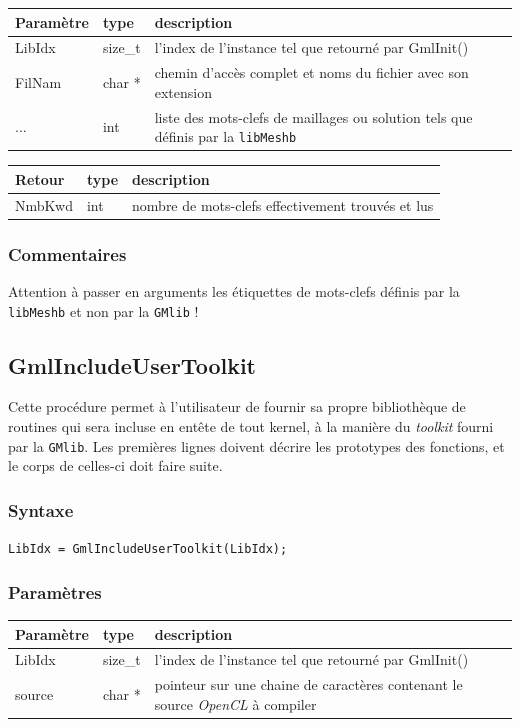 \documentclass[a4paper,12pt]{article}
\begin{document}
\begin{tabular}{|m{2cm}|m{1.5cm}|m{10.5cm}|}
\hline
Paramètre  & type    & description \\
\hline
LibIdx     & size\_t & l'index de l'instance tel que retourné par GmlInit() \\
\hline
FilNam     & char *  & chemin d'accès complet et noms du fichier avec son extension \\
\hline
...        & int     & liste des mots-clefs de maillages ou solution tels que définis par la {\tt libMeshb} \\
\hline
\end{tabular}

\medskip

\begin{tabular}{|m{2cm}|m{1.5cm}|m{10.5cm}|}
\hline
Retour     & type   & description \\
\hline
NmbKwd     & int    & nombre de mots-clefs effectivement trouvés et lus \\
\hline
\end{tabular}

\subsubsection*{Commentaires}
Attention à passer en arguments les étiquettes de mots-clefs définis par la {\tt libMeshb} et non par la {\tt GMlib} !


\subsection{GmlIncludeUserToolkit}

Cette procédure permet à l'utilisateur de fournir sa propre bibliothèque de routines qui sera incluse en entête de tout kernel, à la manière du \emph{toolkit} fourni par la {\tt GMlib}.
Les premières lignes doivent décrire les prototypes des fonctions, et le corps de celles-ci doit faire suite.

\subsubsection*{Syntaxe}

{\tt LibIdx = GmlIncludeUserToolkit(LibIdx);}

\subsubsection*{Paramètres}

\begin{tabular}{|m{2cm}|m{1.5cm}|m{10.5cm}|}
\hline
Paramètre  & type   & description \\
\hline
LibIdx     & size\_t & l'index de l'instance tel que retourné par GmlInit() \\
\hline
source     & char *  & pointeur sur une chaine de caractères contenant le source \emph{OpenCL} à compiler \\
\hline
\end{tabular}
\end{document}

